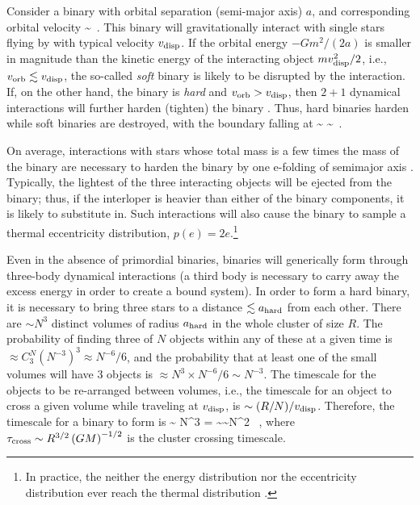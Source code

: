 \documentclass[amsmath,onecolumn]{aastex}
\begin{document}
Consider a binary with orbital separation (semi-major axis) $a$, and corresponding orbital velocity 
\be
\vorb \sim {}\ .
\ee
This binary will gravitationally interact with single stars flying by with typical velocity $v_\textrm{disp}$.   If the orbital energy $- Gm^2 / (2a)$ is smaller in magnitude than the kinetic energy of the interacting object $m v_\textrm{disp}^2 /2$, i.e., $v_\textrm{orb} \lesssim v_\textrm{disp}$, the so-called {\it soft} binary is likely to be disrupted by the interaction.  If, on the other hand, the binary is {\it hard} and $v_\textrm{orb} > v_\textrm{disp}$, then $2+1$ dynamical interactions will further harden (tighten) the binary \citep{Heggie:1975}.    Thus, hard binaries harden while soft binaries are destroyed, with the boundary falling at 
\be
\ahard \sim {} \sim {}\ .
\ee  

On average, interactions with stars whose total mass is a few times the mass of the binary are necessary to harden the binary by one e-folding of semimajor axis \citep{Quinlan:1996}.    Typically, the lightest of the three interacting objects will be ejected from the binary; thus, if the interloper is heavier than either of the binary components, it is likely to substitute in.  Such interactions will also cause the binary to sample a thermal eccentricity distribution, $p(e) = 2e$.\footnote{In practice, the neither the energy distribution nor the eccentricity distribution ever reach the thermal distribution \citep{Geller:2019}.}

  

Even in the absence of primordial binaries, binaries will generically form through three-body dynamical interactions (a third body is necessary to carry away the excess energy in order to create a bound system).  In order to form a hard binary, it is necessary to bring three stars to a distance  $\lesssim a_\textrm{hard}$ from each other.  There are $\sim N^3$ distinct volumes of radius $a_\textrm{hard}$ in the whole cluster of size $R$.  The probability of finding three of $N$ objects within any of these at a given time is $\approx C_3^N \left(N^{-3}\right)^3 \approx N^{-6}/6$, and the probability that at least one of the small volumes will have 3 objects is $\approx N^3 \times N^{-6}/6 \sim N^{-3}$.  The timescale for the objects to be re-arranged between volumes, i.e., the timescale for an object to cross a given volume while traveling at $v_\textrm{disp}$, is $\sim (R/N)/v_\textrm{disp}$.  Therefore, the timescale for a binary to form is 
\be
\tbinform \sim {} N^3 =  \sim {}\sim N^2 \tcross\ , 
\ee
where $\tau_\textrm{cross} \sim R^{3/2} \left(GM\right)^{-1/2}$ is the cluster crossing timescale.
\end{document}
